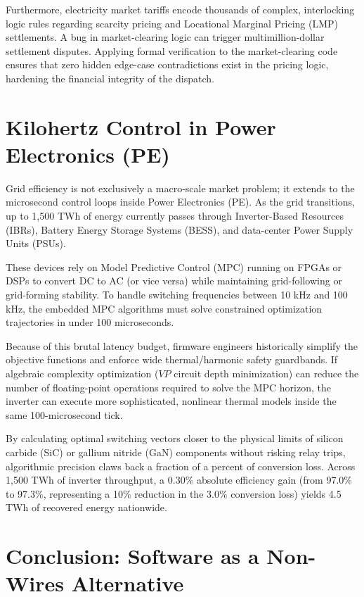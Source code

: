 \documentclass[11pt, a4paper]{article}
\begin{document}
Furthermore, electricity market tariffs encode thousands of complex, interlocking logic rules regarding scarcity pricing and Locational Marginal Pricing (LMP) settlements. A bug in market-clearing logic can trigger multimillion-dollar settlement disputes. Applying formal verification to the market-clearing code ensures that zero hidden edge-case contradictions exist in the pricing logic, hardening the financial integrity of the dispatch.

\section{Kilohertz Control in Power Electronics (PE)}

Grid efficiency is not exclusively a macro-scale market problem; it extends to the microsecond control loops inside Power Electronics (PE). As the grid transitions, up to 1,500 TWh of energy currently passes through Inverter-Based Resources (IBRs), Battery Energy Storage Systems (BESS), and data-center Power Supply Units (PSUs).

These devices rely on Model Predictive Control (MPC) running on FPGAs or DSPs to convert DC to AC (or vice versa) while maintaining grid-following or grid-forming stability. To handle switching frequencies between 10 kHz and 100 kHz, the embedded MPC algorithms must solve constrained optimization trajectories in under 100 microseconds. 

Because of this brutal latency budget, firmware engineers historically simplify the objective functions and enforce wide thermal/harmonic safety guardbands. If algebraic complexity optimization ($VP$ circuit depth minimization) can reduce the number of floating-point operations required to solve the MPC horizon, the inverter can execute more sophisticated, nonlinear thermal models inside the same 100-microsecond tick. 

By calculating optimal switching vectors closer to the physical limits of silicon carbide (SiC) or gallium nitride (GaN) components without risking relay trips, algorithmic precision claws back a fraction of a percent of conversion loss. Across 1,500 TWh of inverter throughput, a 0.30\% absolute efficiency gain (from 97.0\% to 97.3\%, representing a 10\% reduction in the 3.0\% conversion loss) yields 4.5 TWh of recovered energy nationwide.

\section{Conclusion: Software as a Non-Wires Alternative}
\end{document}
